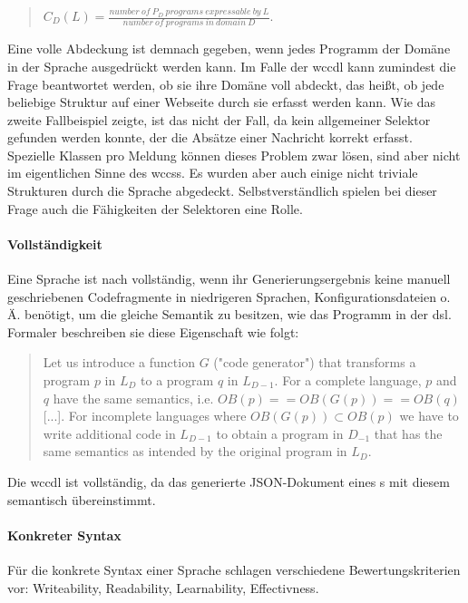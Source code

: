     \begin{quote}
        $C_D(L) = \frac{number\ of\ P_D\ programs\ expressable\ by\ L}{number\ of\ programs\ in\ domain\ D}$.
    \end{quote}

    Eine volle Abdeckung ist demnach gegeben,
    wenn jedes Programm der Domäne in der Sprache ausgedrückt werden kann.
    Im Falle der \gls{wccdl} kann zumindest die Frage beantwortet werden,
    ob sie ihre Domäne voll abdeckt, das heißt, ob jede beliebige Struktur auf einer Webseite
    durch sie erfasst werden kann.
    Wie das zweite Fallbeispiel zeigte, ist das nicht der Fall,
    da kein allgemeiner Selektor gefunden werden konnte,
    der die Absätze einer Nachricht korrekt erfasst.
    Spezielle Klassen pro Meldung können dieses Problem zwar lösen,
    sind aber nicht im eigentlichen Sinne des \glspl{wccs}.
    Es wurden aber auch einige nicht triviale Strukturen durch die Sprache abgedeckt.
    Selbstverständlich spielen bei dieser Frage auch die Fähigkeiten der Selektoren
    eine Rolle.

    \paragraph*{Vollständigkeit}
    Eine Sprache ist nach \citet[Kapitel 4.5]{voelter:DslEngineering}
    vollständig, wenn ihr Generierungsergebnis keine manuell geschriebenen Codefragmente in niedrigeren Sprachen,
    Konfigurationsdateien o. Ä. benötigt,
    um die gleiche Semantik zu besitzen, wie das Programm in der \gls{dsl}.
    Formaler beschreiben sie diese Eigenschaft wie folgt:

    \begin{quote}
        Let us introduce a function $G$ ("code generator") that transforms
        a program $p$ in $L_D$ to a program $q$ in $L_{D-1}$.
        For a complete language, $p$ and $q$ have the same semantics, i.e.
        $OB(p) == OB(G(p)) == OB(q)$ [...]. For incomplete languages
        where $OB(G(p)) \subset OB(p)$ we have to write additional
        code in $L_{D-1}$ to obtain a program in $D_{-1}$ that has the same semantics
        as intended by the original program in $L_D$.
    \end{quote}

    Die \gls{wccdl} ist vollständig, da das generierte JSON-Dokument eines
    {\classificationModel}s mit diesem semantisch übereinstimmt.

    \paragraph*{Konkreter Syntax}
    Für die konkrete Syntax einer Sprache schlagen \citet[Kapitel 4.7]{voelter:DslEngineering}
    verschiedene Bewertungskriterien vor: Writeability, Readability, Learnability, Effectivness.

